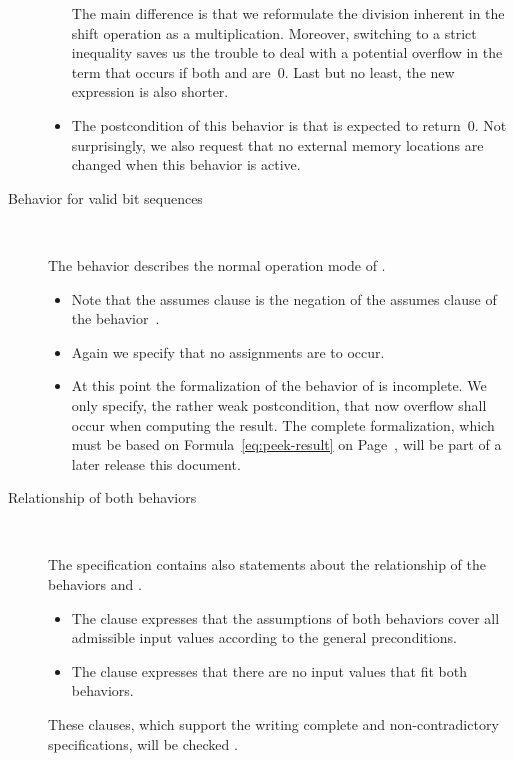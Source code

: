 \begin{description}
\begin{itemize}
The main difference is that we reformulate the division inherent in the shift
operation as a multiplication.
Moreover, switching to a strict inequality saves us the trouble
to deal with a potential overflow in the term 
that occurs if both  and  are~0.
Last but no least, the new expression is also shorter.

\item
The postcondition of this behavior is that \peek is expected to return~0.
Not surprisingly, we also request that no external memory locations are
changed when this behavior is active.

\end{itemize}

\item[Behavior for valid bit sequences]~

The behavior  describes the normal operation mode of \peek.
\begin{itemize}
\item
Note that the assumes clause is the negation of the assumes clause  of
the behavior~.

\item
Again we specify that no assignments are to occur.

\item 
At this point the formalization of the behavior of \peek is incomplete.
We only specify, the rather weak postcondition, that now overflow shall occur
when computing the result.
The complete formalization, which must be based on Formula~\eqref{eq:peek-result}
on Page~\pageref{eq:peek-result}, will be part of a later release this document.
\end{itemize}

\item[Relationship of both behaviors]~

The specification contains also statements about the relationship
of the behaviors  and .

\begin{itemize}
\item
The clause  expresses that
the assumptions of both behaviors cover all admissible 
input values according to the general preconditions.

\item
The clause  expresses
that there are no input values that fit both 
behaviors.
\end{itemize}

These clauses, which support the writing complete and non-contradictory specifications,
will be checked \framacwp.
\end{description}


